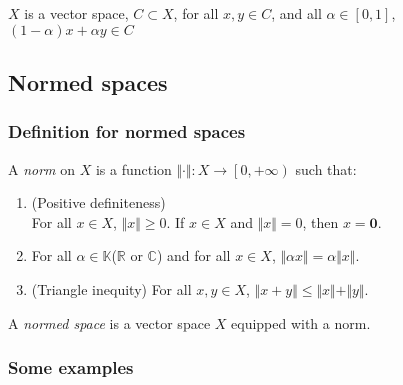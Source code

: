 \documentclass[
	border={25mm 20mm 25mm 30mm},  %
	varwidth,  %
	utf8,
]{standalone}
\newenvironment{myindentpar}[1]%
	{\begin{list}{}%
			{\setlength{\leftmargin}{#1}}%
			\item[]%
	}
 {\end{list}}
\begin{document}
\(X\) is a vector space, \(C\subset X\), for all \(x,y\in C\), and all \(\alpha\in[0,1]\), \((1-\alpha)x+\alpha y\in C\)

\subsection{Normed spaces}

\subsubsection{Definition for normed spaces}

A \textit{norm} on \(X\) is a function \(\Vert\cdot\Vert:X\to\left[0,+\infty\right)\) such that:
\begin{myindentpar}{1em}
	\begin{enumerate}[(1)]
		\item (Positive definiteness)
		      \\For all \(x\in X\), \(\Vert x\Vert\geqslant 0\). If \(x\in X\) and \(\Vert x\Vert=0\), then \(x=\mathbf{0}\).
		\item For all \(\alpha\in\mathbb{K}\)(\(\mathbb{R}\) or \(\mathbb{C}\)) and for all \(x\in X\), \(\Vert \alpha x\Vert=\alpha\Vert x\Vert\).
		\item (Triangle inequity) For all \(x,y\in X\), \(\Vert x+y\Vert\leqslant \Vert x\Vert +\Vert y\Vert\).
	\end{enumerate}
\end{myindentpar}
A \textit{normed space} is a vector space \(X\) equipped with a norm.

\subsubsection{Some examples}
\end{document}
